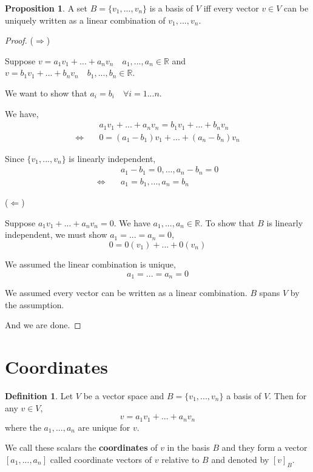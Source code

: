 \documentclass{report}
\theoremstyle{definition}
\newtheorem{_def}{Definition}
\newtheorem{_prop}{Proposition}
\begin{document}
\begin{_prop}
A set $B=\{v_1,...,v_n\}$ is a basis of $V$ iff every vector $v\in V$ can be uniquely written as a linear combination of $v_1,...,v_n$.
\end{_prop}

\begin{proof} ($\Rightarrow$)

Suppose $v=a_1v_1+...+a_nv_n\quad a_1,...,a_n\in \mathbb{R}$ and $v=b_1v_1+...+b_nv_n\quad b_1,...,b_n\in \mathbb{R}$.

We want to show that $a_i=b_i\quad \forall i=1...n$.

We have,
\begin{align*}
& a_1v_1+...+a_nv_n=b_1v_1+...+b_nv_n \\
\Leftrightarrow \quad & 0=(a_1-b_1)v_1+...+(a_n-b_n)v_n
\end{align*}

Since $\{v_1,...,v_n\}$ is linearly independent,
\begin{align*}
& a_1-b_1=0,...,a_n-b_n=0 \\
\Leftrightarrow \quad & a_1=b_1,...,a_n=b_n
\end{align*}

($\Leftarrow$)

Suppose $a_1v_1+...+a_nv_n=0$. 
We have $a_1,...,a_n\in \mathbb{R}$.
To show that $B$ is linearly independent, we must show $a_1=...=a_n=0$,
\[0=0(v_1)+...+0(v_n)\]

We assumed the linear combination is unique,
\[a_1=...=a_n=0\]

We assumed every vector can be written as a linear combination.
$B$ spans $V$ by the assumption.

And we are done.
\end{proof}

\section{Coordinates}

\begin{_def}
Let $V$ be a vector space and $B=\{v_1,...,v_n\}$ a basis of $V$.
Then for any $v\in V$,
\[v=a_1v_1+...+a_nv_n\]
where the $a_1,...,a_n$ are unique for $v$.

We call these scalars the \textbf{coordinates} of $v$ in the basis $B$ and they form a vector $[a_1,...,a_n]$ called coordinate vectors of $v$ relative to $B$ and denoted by $[v]_B$.
\end{_def}
\end{document}
